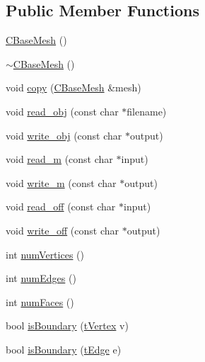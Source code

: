 \subsection*{Public Member Functions}
\begin{DoxyCompactItemize}
\item 
\hyperlink{class_mesh_lib_1_1_c_base_mesh_ac0fb8b8bec22dcfc33d694bae1905e9e}{C\+Base\+Mesh} ()
\item 
\hyperlink{class_mesh_lib_1_1_c_base_mesh_a875ca1255924a0ce68566150d4c55e76}{$\sim$\+C\+Base\+Mesh} ()
\item 
void \hyperlink{class_mesh_lib_1_1_c_base_mesh_a65338968dc92c9d326956a9a60d08f35}{copy} (\hyperlink{class_mesh_lib_1_1_c_base_mesh}{C\+Base\+Mesh} \&mesh)
\item 
void \hyperlink{class_mesh_lib_1_1_c_base_mesh_ad711e992ab1cd7371690eba2b6292b35}{read\+\_\+obj} (const char $\ast$filename)
\item 
void \hyperlink{class_mesh_lib_1_1_c_base_mesh_af885e691fce7e793d5d4185ea286d1cc}{write\+\_\+obj} (const char $\ast$output)
\item 
void \hyperlink{class_mesh_lib_1_1_c_base_mesh_ace7e07c6b5f0d07cdfda11d3f73139f4}{read\+\_\+m} (const char $\ast$input)
\item 
void \hyperlink{class_mesh_lib_1_1_c_base_mesh_aac9e4fdd74de34f44e8ac7afad00c322}{write\+\_\+m} (const char $\ast$output)
\item 
void \hyperlink{class_mesh_lib_1_1_c_base_mesh_a15db6845a5ce5460a92a6afb0fcd1a31}{read\+\_\+off} (const char $\ast$input)
\item 
void \hyperlink{class_mesh_lib_1_1_c_base_mesh_a1ec12eff25a713eb43d2cdef1b452743}{write\+\_\+off} (const char $\ast$output)
\item 
int \hyperlink{class_mesh_lib_1_1_c_base_mesh_a180ba1fbde1e68a4a2201928e6573dc7}{num\+Vertices} ()
\item 
int \hyperlink{class_mesh_lib_1_1_c_base_mesh_a59246eb0edbe1ad11f0e6ecb41444135}{num\+Edges} ()
\item 
int \hyperlink{class_mesh_lib_1_1_c_base_mesh_ac750e49625e3ebbc50a135f77cbbdf87}{num\+Faces} ()
\item 
bool \hyperlink{class_mesh_lib_1_1_c_base_mesh_a74e917019ff789ac7e4e402de81cbe94}{is\+Boundary} (\hyperlink{class_mesh_lib_1_1_c_base_mesh_adcf412e8267910b50f3145d6416947da}{t\+Vertex} v)
\item 
bool \hyperlink{class_mesh_lib_1_1_c_base_mesh_a9cd94b0e1dd28c2aecce5c15975e0bd8}{is\+Boundary} (\hyperlink{class_mesh_lib_1_1_c_base_mesh_a966f6321c2cf92b849e77b931a36821b}{t\+Edge} e)

\end{DoxyCompactItemize}
